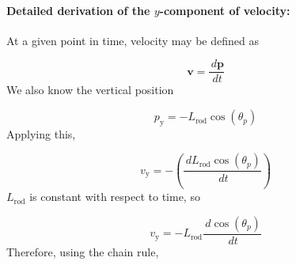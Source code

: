 \documentclass[12pt]{article}
\begin{document}
\paragraph{Detailed derivation of the $y$-component of velocity:}
\label{GD:velocityIYDeriv}
At a given point in time, velocity may be defined as

\begin{displaymath}
\symbf{v}=\frac{\,d\symbf{p}}{\,dt}
\end{displaymath}
We also know the vertical position

\begin{displaymath}
{p_{\text{y}}}=-{L_{\text{rod}}} \cos\left({θ_{p}}\right)
\end{displaymath}
Applying this,

\begin{displaymath}
{v_{\text{y}}}=-\left(\frac{\,d{L_{\text{rod}}} \cos\left({θ_{p}}\right)}{\,dt}\right)
\end{displaymath}
${L_{\text{rod}}}$ is constant with respect to time, so

\begin{displaymath}
{v_{\text{y}}}=-{L_{\text{rod}}} \frac{\,d\cos\left({θ_{p}}\right)}{\,dt}
\end{displaymath}
Therefore, using the chain rule,
\end{document}
